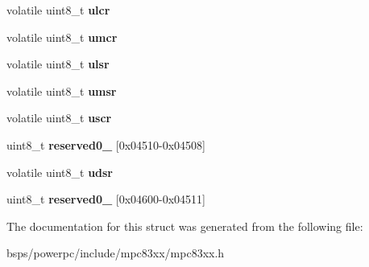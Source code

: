 \begin{DoxyCompactItemize}
\begin{tabbing}
\end{tabbing}\item 
\mbox{\label{structm83xxDUARTRegisters___a2f12c5168a5a9e49ed12bb15933af2ab}} 
volatile uint8\+\_\+t {\bfseries ulcr}
\item 
\mbox{\label{structm83xxDUARTRegisters___abe3173c07dfddb02db66ac878381c952}} 
volatile uint8\+\_\+t {\bfseries umcr}
\item 
\mbox{\label{structm83xxDUARTRegisters___aaa802f2fe8283f0e9332219ce3353da3}} 
volatile uint8\+\_\+t {\bfseries ulsr}
\item 
\mbox{\label{structm83xxDUARTRegisters___a623f7523c915efdc2a0aa019237006d7}} 
volatile uint8\+\_\+t {\bfseries umsr}
\item 
\mbox{\label{structm83xxDUARTRegisters___a6b9b3f6779bab34d5b1a9ac6908be8ee}} 
volatile uint8\+\_\+t {\bfseries uscr}
\item 
\mbox{\label{structm83xxDUARTRegisters___a4b87918b1dfe49927bc4a05528fe4bec}} 
uint8\+\_\+t {\bfseries reserved0\+\_} \mbox{[}0x04510-\/0x04508\mbox{]}
\item 
\mbox{\label{structm83xxDUARTRegisters___adab4055b4e4ed7c5cae7e026f06b8287}} 
volatile uint8\+\_\+t {\bfseries udsr}
\item 
\mbox{\label{structm83xxDUARTRegisters___af7dfab52f381f8b2a8b9250c759c4985}} 
uint8\+\_\+t {\bfseries reserved0\+\_} \mbox{[}0x04600-\/0x04511\mbox{]}
\end{DoxyCompactItemize}


The documentation for this struct was generated from the following file\+:\begin{DoxyCompactItemize}
\item 
bsps/powerpc/include/mpc83xx/mpc83xx.\+h\end{DoxyCompactItemize}
